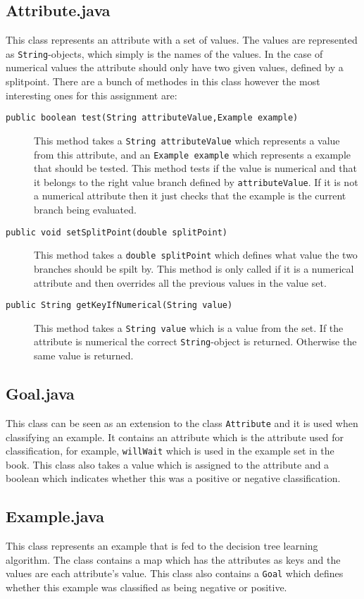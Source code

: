 \documentclass[a4paper]{article}
\begin{document}
\subsection{Attribute.java}
This class represents an attribute with a set of values. The values are represented as \texttt{String}-objects, which simply is the names of the values. In the case of numerical values the attribute should only have two given values, defined by a splitpoint. There are a bunch of methodes in this class however the most interesting ones for this assignment are:
\begin{description}
\item[\texttt{public boolean test(String attributeValue,Example example)}] This method takes a \texttt{String attributeValue} which represents a value from this attribute, and an \texttt{Example example} which represents a example that should be tested. 
This method tests if the value is numerical and that it belongs to the right value branch defined by \texttt{attributeValue}. If it is not a numerical attribute then it just checks that the example is the current branch being evaluated.
\item[\texttt{public void setSplitPoint(double splitPoint)}] This method takes a \texttt{double splitPoint} which defines what value the two branches should be spilt by. This method is only called if it is a numerical attribute and then overrides all the previous values in the value set.
\item[\texttt{public String getKeyIfNumerical(String value)}] This method takes a \texttt{String value} which is a value from the set. If the attribute is numerical the correct \texttt{String}-object is returned. Otherwise the same value is returned. 
\end{description} 
\subsection{Goal.java}
This class can be seen as an extension to the class \texttt{Attribute} and it is used when classifying an example. It contains an attribute which is the attribute used for classification, for example, \texttt{willWait} which is used in the example set in the book. This class also takes a value which is assigned to the attribute and a boolean which indicates whether this was a positive or negative classification.
\subsection{Example.java}
This class represents an example that is fed to the decision tree learning algorithm. The class contains a map which has the attributes as keys and the values are each attribute's value. This class also contains a \texttt{Goal} which defines whether this example was classified as being negative or positive.
\end{document}
